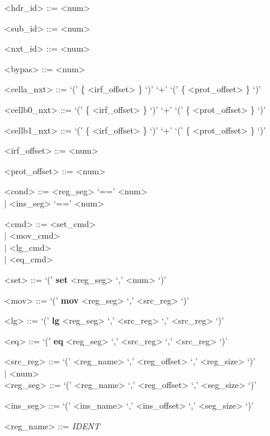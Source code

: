 \documentclass{article}
\begin{document}
\begin{grammar} \small

{\renewcommand\baselinestretch{0}\selectfont

<hdr\_id>     ::=   <num>

<sub\_id>     ::=   <num>

<nxt\_id>     ::=   <num>

<bypas>     ::=   <num>

<cella\_nxt>     ::= `(' \{ <irf\_offset> \} `)' `+' `(' \{ <prot\_offset> \} `)'

<cellb0\_nxt>     ::= `(' \{ <irf\_offset> \} `)' `+' `(' \{ <prot\_offset> \} `)'

<cellb1\_nxt>     ::= `(' \{ <irf\_offset> \} `)' `+' `(' \{ <prot\_offset> \} `)'

<irf\_offset>     ::=   <num>

<prot\_offset>     ::=   <num>

<cond>     ::=   <reg\_seg> `==' <num>   \\
     \hspace*{0.62cm} $\mid$  <ins\_seg> `==' <num>

<cmd>     ::=   <set\_cmd> \\
     \hspace*{0.55cm} $\mid$  <mov\_cmd> \\
     \hspace*{0.55cm} $\mid$  <lg\_cmd> \\
     \hspace*{0.55cm} $\mid$  <eq\_cmd>

<set>   ::= `(' \textbf{set}  <reg\_seg> `,' <num> `)'

<mov>   ::= `(' \textbf{mov}  <reg\_seg> `,' <src\_reg> `)'

<lg>   ::= `(' \textbf{lg}  <reg\_seg> `,' <src\_reg> `,' <src\_reg> `)'

<eq>   ::= `(' \textbf{eq}  <reg\_seg> `,' <src\_reg>  `,' <src\_reg> `)'

<src\_reg>   ::= `(' <reg\_name> `,' <reg\_offset> `,' <reg\_size> `)'  \\
     \hspace*{0.96cm} $\mid$  <num> \\

<reg\_seg>   ::= `(' <reg\_name> `,' <reg\_offset> `,' <seg\_size> `)'

<ins\_seg>   ::= `(' <ins\_name> `,' <ins\_offset> `,' <seg\_size> `)'

<reg\_name>     ::=   \emph{IDENT}

}
\end{grammar}
\end{document}
